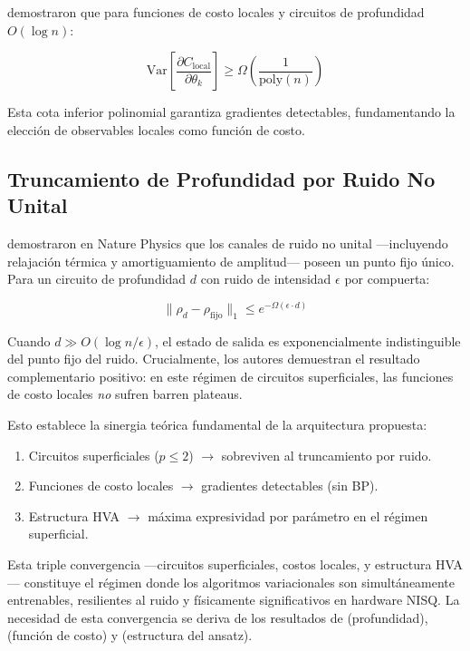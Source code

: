 \documentclass[11pt,a4paper,spanish]{book}
\begin{document}
\citet{cerezo2021} demostraron que para funciones de costo locales y circuitos de profundidad $O(\log n)$:

\begin{equation}
\text{Var}\left[\frac{\partial C_{\text{local}}}{\partial \theta_k}\right] \geq \Omega\left(\frac{1}{\text{poly}(n)}\right)
\label{eq:local_bp}
\end{equation}

\noindent Esta cota inferior polinomial garantiza gradientes detectables, fundamentando la elección de observables locales como función de costo.

\subsection{Truncamiento de Profundidad por Ruido No Unital}

\citet{mele2026} demostraron en Nature Physics que los canales de ruido no unital ---incluyendo relajación térmica y amortiguamiento de amplitud--- poseen un punto fijo único. Para un circuito de profundidad $d$ con ruido de intensidad $\epsilon$ por compuerta:

\begin{equation}
\|\rho_d - \rho_{\text{fijo}}\|_1 \leq e^{-\Omega(\epsilon \cdot d)}
\label{eq:truncation}
\end{equation}

Cuando $d \gg O(\log n / \epsilon)$, el estado de salida es exponencialmente indistinguible del punto fijo del ruido. Crucialmente, los autores demuestran el resultado complementario positivo: en este régimen de circuitos superficiales, las funciones de costo locales \emph{no} sufren barren plateaus.

Esto establece la sinergia teórica fundamental de la arquitectura propuesta:
\begin{enumerate}
    \item Circuitos superficiales ($p \leq 2$) $\to$ sobreviven al truncamiento por ruido.
    \item Funciones de costo locales $\to$ gradientes detectables (sin BP).
    \item Estructura HVA $\to$ máxima expresividad por parámetro en el régimen superficial.
\end{enumerate}

Esta triple convergencia ---circuitos superficiales, costos locales, y estructura HVA--- constituye el régimen donde los algoritmos variacionales son simultáneamente entrenables, resilientes al ruido y físicamente significativos en hardware NISQ. La necesidad de esta convergencia se deriva de los resultados de \citet{mele2026} (profundidad), \citet{cerezo2021} (función de costo) y \citet{wiersema2020} (estructura del ansatz).
\end{document}

